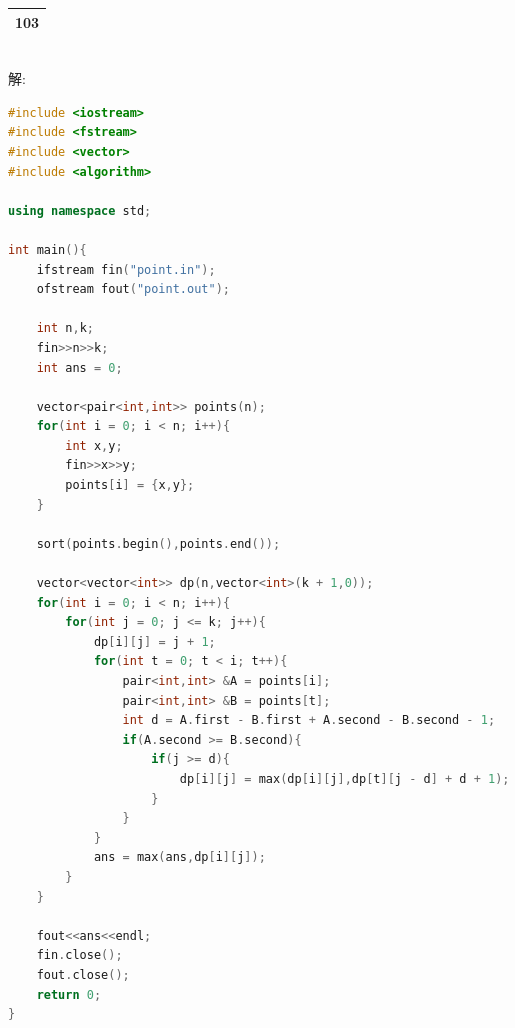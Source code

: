 \documentclass[12pt,twiside,a4paper]{ctexbook}
\numberwithin{chapter}{part}
\begin{document}
\begin{tabular}{|c|}
\hline
103\\
\hline
\end{tabular}\\
解:
\begin{lstlisting}[language=C++,breaklines=true]
#include <iostream>
#include <fstream>
#include <vector>
#include <algorithm>

using namespace std;

int main(){
	ifstream fin("point.in");
	ofstream fout("point.out");

	int n,k;
	fin>>n>>k;
	int ans = 0;

	vector<pair<int,int>> points(n);
	for(int i = 0; i < n; i++){
		int x,y;
		fin>>x>>y;
		points[i] = {x,y};
	}

	sort(points.begin(),points.end());

	vector<vector<int>> dp(n,vector<int>(k + 1,0));
	for(int i = 0; i < n; i++){
		for(int j = 0; j <= k; j++){
			dp[i][j] = j + 1;
			for(int t = 0; t < i; t++){
				pair<int,int> &A = points[i];
				pair<int,int> &B = points[t];
				int d = A.first - B.first + A.second - B.second - 1;
				if(A.second >= B.second){
					if(j >= d){
						dp[i][j] = max(dp[i][j],dp[t][j - d] + d + 1);
					}
				}
			}
			ans = max(ans,dp[i][j]);
		}
	}

	fout<<ans<<endl;
	fin.close();
	fout.close();
	return 0;
}
\end{lstlisting}
\end{document}
